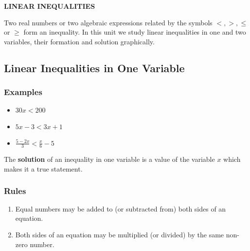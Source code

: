 \documentclass[12pt]{article}
\begin{document}
\begin{center}
    {\LARGE \textbf{LINEAR INEQUALITIES} }
\end{center}

\begin{multicols}{2}

    Two real numbers or two algebraic expressions related by the symbols $<, >, \leq$ or $\geq$ form an inequality. In this unit we study linear inequalities in one and two variables, their formation and solution graphically.

\subsection*{ Linear Inequalities in One Variable}

\subsubsection*{Examples}
\begin{itemize}
    \item $30x<200$
    \item $5x - 3 < 3x +1$
    \item $\frac{5-2x}{3}<\frac{x}{6}-5$
\end{itemize}

The \textbf{solution} of an inequality in one variable is a value of the variable $x$ which makes it a true statement.

\subsubsection*{Rules}
\begin{enumerate}
    \item Equal numbers may be added to (or subtracted from) both sides of an equation.
    \item Both sides of an equation may be multiplied (or divided) by the same non-zero
    number.
    

\end{enumerate}
\end{multicols}
\end{document}
